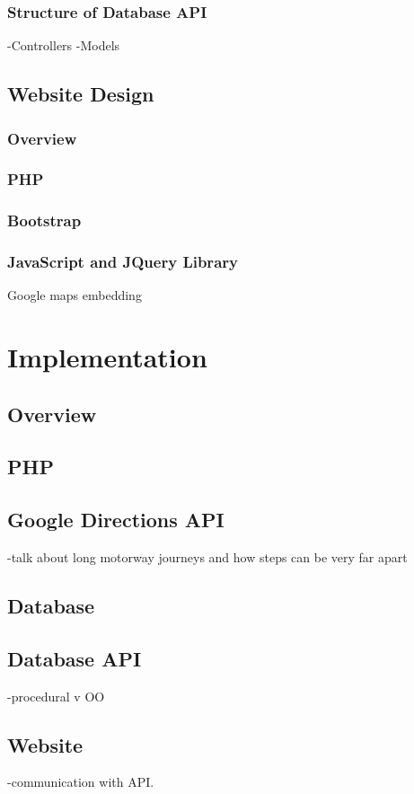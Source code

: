 \documentclass[11pt]{article}
\begin{document}
		\subsubsection{Structure of Database API}
		-Controllers
		-Models
	\subsection{Website Design}
		\subsubsection{Overview}
		\subsubsection{PHP}
		\subsubsection{Bootstrap}
		\subsubsection{JavaScript and JQuery Library}
		Google maps embedding

\section{Implementation}
	\subsection{Overview}
	\subsection{PHP}
	\subsection{Google Directions API}
	-talk about long motorway journeys and how steps can be very far apart
	\subsection{Database}
	\subsection{Database API}
	-procedural v OO
	\subsection{Website}
	-communication with API.
	
\end{document}
